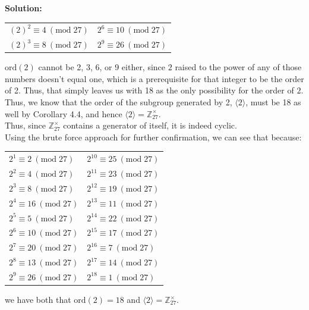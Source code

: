 \documentclass{article}
\newenvironment{solution}{
	\vspace{.5em}
	\par
	\begin{adjustwidth}{1.5em}{}
	\textbf{{Solution:}}
	\par
	\vspace{.5em}
}{
	\vspace{1em}
	\end{adjustwidth}
	\setcounter{step}{0}
	\newpage
}
\newcounter{step}
\newcommand{\ord}[1]{\text{ord}({#1})}
\newcommand{\gen}[1]{\langle {#1} \rangle}
\renewcommand{\mod}[1]{\ (\text{mod} \; {#1})}
\begin{document}
\begin{solution}
	\begin{tabularx}{\linewidth}{Y Y}
		$(2)^{2} \equiv 4 \mod{27}$ & $2^{6} \equiv 10 \mod{27}$ \\
		$(2)^{3} \equiv 8 \mod{27}$ & $2^{9} \equiv 26 \mod{27}$ \\
	\end{tabularx}

	\vspace{1em}

	$\ord{2}$ cannot be 2, 3, 6, or 9 either, since $2$ raised to the power of any of those numbers doesn't equal one, which is a prerequisite for that integer to be the order of 2. Thus, that simply leaves us with 18 as the only possibility for the order of $2$. Thus, we know that the order of the subgroup generated by 2, $\gen{2}$, must be 18 as well by Corollary 4.4, and hence $\gen{2} = \mathbb{Z}^{\times}_{27}$. \\

	Thus, since $\mathbb{Z}^{\times}_{27}$ contains a generator of itself, it is indeed cyclic. \\

	Using the brute force approach for further confirmation, we can see that because:

	\vspace{1em}

	\begin{tabularx}{\linewidth}{Y Y}
		$2^{1} \equiv 2 \mod{27}$ & $2^{10} \equiv 25 \mod{27}$ \\
		$2^{2} \equiv 4 \mod{27}$ & $2^{11} \equiv 23 \mod{27}$ \\
		$2^{3} \equiv 8 \mod{27}$ & $2^{12} \equiv 19 \mod{27}$ \\
		$2^{4} \equiv 16 \mod{27}$ & $2^{13} \equiv 11 \mod{27}$ \\
		$2^{5} \equiv 5 \mod{27}$ & $2^{14} \equiv 22 \mod{27}$ \\
		$2^{6} \equiv 10 \mod{27}$ & $2^{15} \equiv 17 \mod{27}$ \\
		$2^{7} \equiv 20 \mod{27}$ & $2^{16} \equiv 7 \mod{27}$ \\
		$2^{8} \equiv 13 \mod{27}$ & $2^{17} \equiv 14 \mod{27}$ \\
		$2^{9} \equiv 26 \mod{27}$ & $2^{18} \equiv 1 \mod{27}$ \\
	\end{tabularx}

	\vspace{1em}

	we have both that $\ord{2} = 18$ and $\gen{2} = \mathbb{Z}^{\times}_{27}$. \\


\end{solution}
\end{document}
